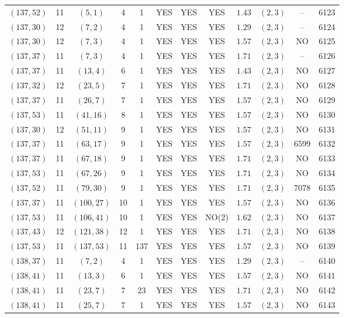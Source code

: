 \begin{longtable}{|c|c|c|c|c|c|c|c|c|c|c|c|}
$(137,52)$ & 11 & $(5,1)$ & 4 & 1 & YES & YES & YES & $1.43$ & $(2,3)$ & -- & 6123\\
$(137,30)$ & 12 & $(7,2)$ & 4 & 1 & YES & YES & YES & $1.29$ & $(2,3)$ & -- & 6124\\
$(137,30)$ & 12 & $(7,3)$ & 4 & 1 & YES & YES & YES & $1.57$ & $(2,3)$ & NO & 6125\\
$(137,37)$ & 11 & $(7,3)$ & 4 & 1 & YES & YES & YES & $1.71$ & $(2,3)$ & -- & 6126\\
$(137,37)$ & 11 & $(13,4)$ & 6 & 1 & YES & YES & YES & $1.43$ & $(2,3)$ & NO & 6127\\
$(137,32)$ & 12 & $(23,5)$ & 7 & 1 & YES & YES & YES & $1.71$ & $(2,3)$ & NO & 6128\\
$(137,37)$ & 11 & $(26,7)$ & 7 & 1 & YES & YES & YES & $1.57$ & $(2,3)$ & NO & 6129\\
$(137,53)$ & 11 & $(41,16)$ & 8 & 1 & YES & YES & YES & $1.57$ & $(2,3)$ & NO & 6130\\
$(137,30)$ & 12 & $(51,11)$ & 9 & 1 & YES & YES & YES & $1.57$ & $(2,3)$ & NO & 6131\\
$(137,37)$ & 11 & $(63,17)$ & 9 & 1 & YES & YES & YES & $1.57$ & $(2,3)$ & 6599 & 6132\\
$(137,37)$ & 11 & $(67,18)$ & 9 & 1 & YES & YES & YES & $1.71$ & $(2,3)$ & NO & 6133\\
$(137,53)$ & 11 & $(67,26)$ & 9 & 1 & YES & YES & YES & $1.71$ & $(2,3)$ & NO & 6134\\
$(137,52)$ & 11 & $(79,30)$ & 9 & 1 & YES & YES & YES & $1.71$ & $(2,3)$ & 7078 & 6135\\
$(137,37)$ & 11 & $(100,27)$ & 10 & 1 & YES & YES & YES & $1.57$ & $(2,3)$ & NO & 6136\\
$(137,53)$ & 11 & $(106,41)$ & 10 & 1 & YES & YES & NO(2) & $1.62$ & $(2,3)$ & NO & 6137\\
$(137,43)$ & 12 & $(121,38)$ & 12 & 1 & YES & YES & YES & $1.71$ & $(2,3)$ & NO & 6138\\
$(137,53)$ & 11 & $(137,53)$ & 11 & 137 & YES & YES & YES & $1.57$ & $(2,3)$ & NO & 6139\\
$(138,37)$ & 11 & $(7,2)$ & 4 & 1 & YES & YES & YES & $1.29$ & $(2,3)$ & -- & 6140\\
$(138,41)$ & 11 & $(13,3)$ & 6 & 1 & YES & YES & YES & $1.57$ & $(2,3)$ & NO & 6141\\
$(138,41)$ & 11 & $(23,7)$ & 7 & 23 & YES & YES & YES & $1.71$ & $(2,3)$ & NO & 6142\\
$(138,41)$ & 11 & $(25,7)$ & 7 & 1 & YES & YES & YES & $1.57$ & $(2,3)$ & NO & 6143\\

\end{longtable}
